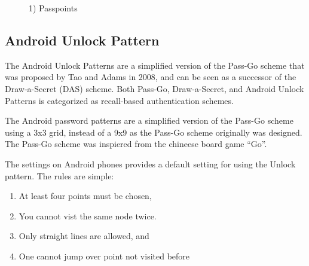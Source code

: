      \begin{figure}[H]
        \centering
        \caption{1) Passpoints}
      \end{figure}

  
  \clearpage
  \subsection{Android Unlock Pattern}


    The Android Unlock Patterns are a simplified version of the Pass-Go scheme that was proposed by 
    Tao and Adams in 2008, and can be seen as a successor of the Draw-a-Secret (DAS) scheme.
    Both Pass-Go, Draw-a-Secret, and Android Unlock Patterns is categorized as recall-based authentication schemes.

    The Android password patterns are a simplified version of the Pass-Go scheme using a 3x3 grid, instead of a 9x9 as 
    the Pass-Go scheme originally was designed. The Pass-Go scheme was inspiered from the chineese board game ``Go''.

    The settings on Android phones provides a default setting for using the Unlock pattern. 
    The rules are simple: 
        \begin{enumerate}
            \item At least four points must be chosen,
            \item You cannot vist the same node twice.
            \item Only straight lines are allowed, and
            \item One cannot jump over point not visited before
        \end{enumerate}

